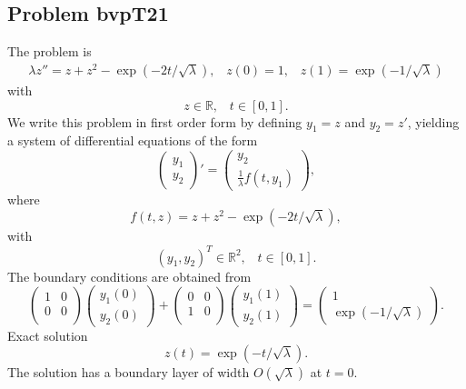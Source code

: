 \documentclass[<options>]{article}
\def \RR {{\mathbb{R}}}
\begin{document}
\subsection{Problem bvpT21}\label{test21}
The problem is 
\begin{eqnarray*}
\lambda z'' =   z +  z^{2} - \exp(-2 t / \sqrt{\lambda}), \;\;\;z(0) = 1, \;\;\; z(1) = \exp(-1 / \sqrt{\lambda})
\end{eqnarray*}
with
\[
z \in \RR, \;\;\; t\in [0,1].
\]
We write this problem in first order form by defining $y_1=z$ and $y_2=z'$, yielding a system of differential equations of the form
\begin{equation*}
\left(\begin{array}{c}
y_1\\
y_2
\end{array}\right)'=
\left(\begin{array}{c}
y_2\\
\frac{1}{\lambda}f(t,y_1)
\end{array}\right),
\end{equation*}
where
\begin{equation*}
f(t,z) = z +  z^{2} - \exp(-2 t / \sqrt{\lambda}),
\end{equation*}
with
\[
(y_1,y_2)^T \in \RR^{2}, \;\;\;  t \in [0,1].
\]
The  boundary conditions are obtained from
\begin{equation*}
\left(
  \begin{array}{cc}
    1 & 0 \\
    0 & 0 \\
  \end{array}
\right)
\left(\begin{array}{c}
y_{1}(0)\\
y_{2}(0)
\end{array}\right)
+
\left(
  \begin{array}{cc}
    0 & 0 \\
    1 & 0 \\
  \end{array}
\right)
\left(\begin{array}{c}
y_{1}(1)\\
y_{2}(1)
\end{array}\right)=\left(\begin{array}{c}
1  \\
\exp(-1 / \sqrt{\lambda})
\end{array}\right).
\end{equation*}
\textrm{Exact solution}
$$z(t) =  \exp(-t / \sqrt{\lambda}).$$
The solution has a boundary layer of width $O(\sqrt\lambda)$  at $t = 0.$
\end{document}

